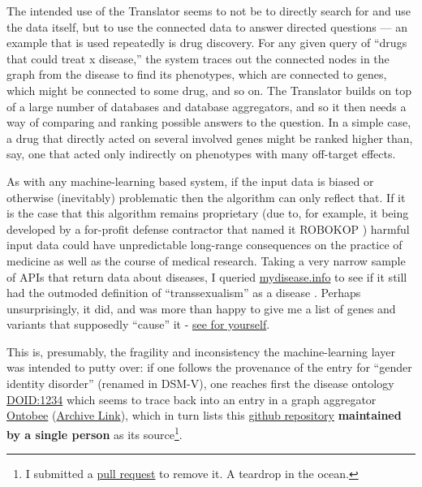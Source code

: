 \documentclass[10pt]{tufte-book}
\begin{document}
The intended use of the Translator seems to not be to directly search
for and use the data itself, but to use the connected data to answer
directed questions \citep{goelExplanationContainerCaseBased2021} 
--- an example that is used repeatedly is drug discovery. For any given
query of ``drugs that could treat x disease,'' the system traces out the
connected nodes in the graph from the disease to find its phenotypes,
which are connected to genes, which might be connected to some drug, and
so on. The Translator builds on top of a large number of databases and
database aggregators, and so it then needs a way of comparing and
ranking possible answers to the question. In a simple case, a drug that
directly acted on several involved genes might be ranked higher than,
say, one that acted only indirectly on phenotypes with many off-target
effects.

As with any machine-learning based system, if the input data is biased
or otherwise (inevitably) problematic then the algorithm can only
reflect that. If it is the case that this algorithm remains proprietary
(due to, for example, it being developed by a for-profit defense
contractor that named it ROBOKOP \citep{ROBOKOPCoVar2021} )
harmful input data could have unpredictable long-range consequences on
the practice of medicine as well as the course of medical research.
Taking a very narrow sample of APIs that return data about diseases, I
queried \href{https://mydisease.info}{mydisease.info} to see if it still
had the outmoded definition of ``transsexualism'' as a disease \citep{ramTransphobiaEncodedExamination2021} . Perhaps unsurprisingly, it
did, and was more than happy to give me a list of genes and variants
that supposedly ``cause'' it -
\href{http://mydisease.info/v1/query?q=\%22DOID\%3A10919\%22}{see for
yourself}.

This is, presumably, the fragility and inconsistency the
machine-learning layer was intended to putty over: if one follows the
provenance of the entry for ``gender identity disorder'' (renamed in
DSM-V), one reaches first the disease ontology
\href{https://web.archive.org/web/20211007053446/https://www.ebi.ac.uk/ols/ontologies/doid/terms?iri=http\%3A\%2F\%2Fpurl.obolibrary.org\%2Fobo\%2FDOID_1234}{DOID:1234}
which seems to trace back into an entry in a graph aggregator
\href{http://www.ontobee.org/ontology/DOID?iri=http://purl.obolibrary.org/obo/DOID_1234}{Ontobee}
(\href{https://web.archive.org/web/20210923110103/http://www.ontobee.org/ontology/DOID?iri=http://purl.obolibrary.org/obo/DOID_1234}{Archive
Link}), which in turn lists this
\href{https://github.com/jannahastings/mental-functioning-ontology}{github
repository} \textbf{maintained by a single person} as its
source\footnote{I submitted a
  \href{https://github.com/jannahastings/mental-functioning-ontology/pull/8}{pull
  request} to remove it. A teardrop in the ocean.}.
\end{document}
